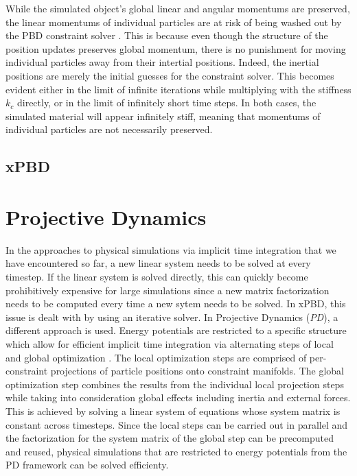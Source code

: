 While the simulated object's global linear and angular momentums are preserved, the linear momentums of individual particles are at risk of 
being washed out by the PBD constraint solver \cite{bouaziz2014}. This is because even though the structure of the position updates 
preserves global momentum,
there is no punishment for moving individual particles away from their intertial positions. Indeed, the inertial positions are merely the 
initial guesses for the constraint solver. This becomes evident either in the limit of 
infinite iterations while multiplying with the stiffness $k_c$ directly, or in the limit of infinitely short time steps. In both cases,
the simulated material will appear infinitely stiff, meaning that momentums of individual particles are not necessarily preserved.

\subsection{xPBD}\label{ss:xpbd}

\section{Projective Dynamics}\label{s:pd}

In the approaches to physical simulations via implicit time integration that we have encountered so far, a new linear system needs to be solved
at every timestep. If the linear system is solved directly, this can quickly become prohibitively expensive for large simulations since 
a new matrix factorization needs to be computed every time a new sytem needs to be solved. In xPBD, this issue is dealt with by using an iterative 
solver. In Projective Dynamics (\emph{PD}), a different approach is used. Energy potentials are restricted to a specific structure which allow for 
efficient implicit time integration via alternating steps of local and global optimization \cite{bouaziz2014}. The local optimization 
steps are comprised of 
per-constraint projections of particle positions onto constraint manifolds. The global optimization step combines the results from the individual 
local projection steps while taking into consideration global effects including inertia and external forces. This is achieved by solving a 
linear system of equations whose system matrix is constant across timesteps. Since the local steps can be carried out in parallel and the 
factorization for the system matrix of the global step can be precomputed and reused, physical simulations that are restricted to energy potentials 
from the PD framework can be solved efficienty.

